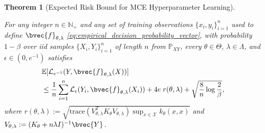 \documentclass[twoside]{article}
\newtheorem{theorem}{Theorem}[section]
\begin{document}
		\begin{theorem}[Expected Risk Bound for \gls{MCE} Hyperparameter Learning]
			\label{thm:expected_risk_bound_hyperparameter_learning_copy}
			
			For any integer $n \in \mathbb{N}_{+}$ and any set of training observations $\{x_{i}, y_{i}\}_{i = 1}^{n}$ used to define $\bvec{f}_{\theta, \lambda}$ \eqref{eq:empirical_decision_probability_vector}, with probability $1 - \beta$ over \textit{iid} samples $\{X_{i}, Y_{i}\}_{i = 1}^{n}$ of length $n$ from $\mathbb{P}_{X Y}$, every $\theta \in \Theta$, $\lambda \in \Lambda$, and $\epsilon \in (0, e^{-1})$ satisfies
			\begin{equation}
			\begin{aligned}
			&\mathbb{E}[\mathcal{L}_{e^{-1}}(Y, \bvec{f}_{\theta, \lambda}(X))] \\
			&\leq \frac{1}{n} \sum_{i = 1}^{n} \mathcal{L}_{\epsilon}(Y_{i}, \bvec{f}_{\theta, \lambda}(X_{i})) + 4 e \; r(\theta, \lambda) + \sqrt{\frac{8}{n} \log{\frac{2}{\beta}}},
			\label{eq:expected_risk_bound_hyperparameter_learning_copy}
			\end{aligned}
			\end{equation}
			where $r(\theta, \lambda) := \sqrt{\mathrm{trace}(V_{\theta, \lambda}^{T} K_{\theta} V_{\theta, \lambda}) \sup_{x \in \mathcal{X}} k_{\theta}(x, x)}$ and $V_{\theta, \lambda} := (K_{\theta} + n \lambda I)^{-1} \bvec{Y}$.
		\end{theorem}
		
\end{document}

